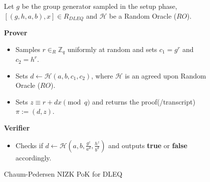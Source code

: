 \begin{figure}[ht]
    \centering
    \begin{tcolorbox}[title=\textbf{Chaum-Pedersen Protocol for DLEQ}, width=0.9\textwidth, colframe=blue!75!black, colback=blue!10, sharp corners]
        Let $g$ be the group generator sampled in the setup phase, $[(g,h,a,b),x]\in R_{DLEQ}$ and 
        $\mathcal{H}$ be a Random Oracle ($RO$).\par
        \vspace{0.5em}
        \textbf{Prover}
        \begin{itemize}
            \item Samples $r\in_{R}\mathbb{Z}_q$ uniformly at random and sets 
                $c_1=g^r$ and $c_2=h^r$.
            \item Sets $d\leftarrow \mathcal{H}(a,b,c_1,c_2)$, where $\mathcal{H}$ is 
                an agreed upon Random Oracle ($RO$).
            \item Sets $z\equiv r+dx \pmod{q}$ and returns the proof(/transcript) $\pi:= (d,z)$.
        \end{itemize}
        
        \vspace{0.5em}
        \textbf{Verifier}
        \begin{itemize}
            \item Checks if $d\leftarrow \mathcal{H}(a,b,\frac{g^z}{a^d},\frac{h^z}{b^d})$ 
                and outputs \textbf{true} or \textbf{false} accordingly.
        \end{itemize}
    \end{tcolorbox}
    \caption{Chaum-Pedersen NIZK PoK for DLEQ}
    \label{fig:chaum-pedersen}
\end{figure}
